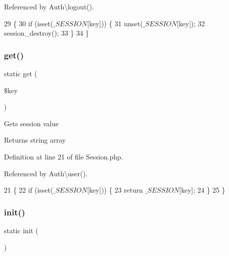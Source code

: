 Referenced by Auth\textbackslash{}logout().


\begin{DoxyCode}
29                                          \{
30         \textcolor{keywordflow}{if} (isset($\_SESSION[$key])) \{
31             unset($\_SESSION[$key]);
32             session\_destroy();
33         \}
34     \}
\end{DoxyCode}
\hypertarget{class_session_a15e2679f2a8f6fa4d60757f4d65413ac}{}\label{class_session_a15e2679f2a8f6fa4d60757f4d65413ac} 
\subsubsection{\texorpdfstring{get()}{get()}}
{\footnotesize\ttfamily static get (\begin{DoxyParamCaption}\item[{}]{\$key }\end{DoxyParamCaption})\hspace{0.3cm}{\ttfamily [static]}}

Gets session value

\begin{DoxyReturn}{Returns}
string array 
\end{DoxyReturn}


Definition at line 21 of file Session.\+php.



Referenced by Auth\textbackslash{}user().


\begin{DoxyCode}
21                                      \{
22         \textcolor{keywordflow}{if} (isset($\_SESSION[$key])) \{
23             \textcolor{keywordflow}{return} $\_SESSION[$key];
24         \}
25     \}
\end{DoxyCode}
\hypertarget{class_session_a9f0be6ae273d3669e11c29910a0be338}{}\label{class_session_a9f0be6ae273d3669e11c29910a0be338} 
\subsubsection{\texorpdfstring{init()}{init()}}
{\footnotesize\ttfamily static init (\begin{DoxyParamCaption}{ }\end{DoxyParamCaption})\hspace{0.3cm}{\ttfamily [static]}}

